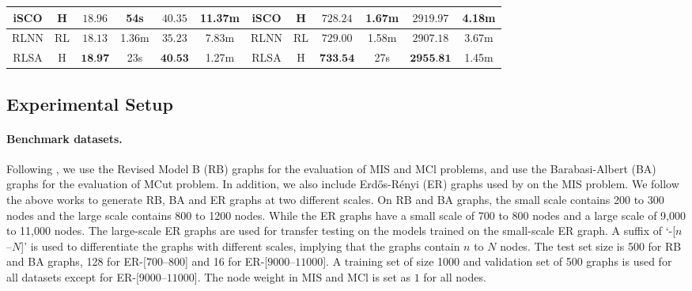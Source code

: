 \begin{table*}[ht!]
\begin{tabular}{cc|cccc|cc|cccc}
     iSCO & H & \textcolor{mygreen}{$18.96$} & 54s & \textcolor{mygreen}{$40.35$} & 11.37m & iSCO & H & $728.24$ &  1.67m & $2919.97$ &  4.18m \\
     \midrule 
     RLNN & RL & $18.13$ & 1.36m & $35.23$ & 7.83m & RLNN & RL &\textcolor{mygreen}{$729.00$} & 1.58m & $2907.18$ & 3.67m\\ 
    RLSA & H & $\textbf{18.97}$ & 23s &  $\textbf{40.53}$ & 1.27m & RLSA & H  & $\textbf{733.54}$ & 27s &  $\textbf{2955.81}$ & 1.45m \\
    \bottomrule
    \end{tabular}

    \label{tab:mc}
\end{table*}

\subsection{Experimental Setup}

\paragraph{Benchmark datasets.} Following \citet{zhang2023let}, we use the Revised Model B (RB) graphs \citep{Xu2000ExactPT} for the evaluation of MIS and MCl problems, and use the Barabasi-Albert (BA) graphs \citep{doi:10.1126/science.286.5439.509} for the evaluation of MCut problem. In addition, we also include Erdős-Rényi (ER) graphs \citep{Erdos1984OnTE} used by \citet{qiu2022dimes} on the MIS problem. We follow the above works to generate RB, BA and ER graphs at two different scales. On RB and BA graphs, the small scale contains 200 to 300 nodes and the large scale contains 800 to 1200 nodes. While the ER graphs have a small scale of 700 to 800 nodes and a large scale  of 9,000 to 11,000 nodes. The large-scale ER graphs are used for transfer testing on the models trained on the small-scale ER graph. A suffix of `-[$n$--$N$]' is used to differentiate the graphs with different scales, implying that the graphs contain $n$ to $N$ nodes. The test set size is 500 for RB and BA graphs, 128 for ER-[$700$--$800$] and 16 for ER-[$9000$--$11000$]. A training set of size 1000 and validation set of 500 graphs is used for all datasets except for ER-[$9000$--$11000$]. The node weight in MIS and MCl is set as $1$ for all nodes.

